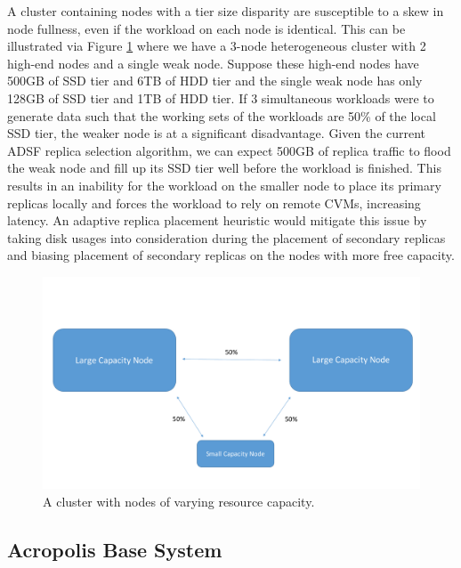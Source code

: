 \documentclass[12pt]{article}
\begin{document}
    A cluster containing nodes with a tier size disparity are susceptible to a
    skew in node fullness, even if the workload on each node is identical. This
    can be illustrated via Figure \ref{fig:tier_size_disparity} where we have a
    3-node heterogeneous cluster with 2 high-end nodes and a single weak node.
    Suppose these high-end nodes have 500GB of SSD tier and 6TB of HDD tier and
    the single weak node has only 128GB of SSD tier and 1TB of HDD tier. If 3
    simultaneous workloads were to generate data such that the working sets of
    the workloads are 50\% of the local SSD tier, the weaker node is at a
    significant disadvantage. Given the current ADSF replica selection
    algorithm, we can expect 500GB of replica traffic to flood the weak node
    and fill up its SSD tier well before the workload is finished. This results
    in an inability for the workload on the smaller node to place its primary
    replicas locally and forces the workload to rely on remote CVMs, increasing
    latency. An adaptive replica placement heuristic would mitigate this issue
    by taking disk usages into consideration during the placement of secondary
    replicas and biasing placement of secondary replicas on the nodes with more
    free capacity.

    \begin{figure}[h]
      \centering
      \includegraphics[scale=0.45]{images/homogeneous_tier_disparity.pdf} 
      \caption{A cluster with nodes of varying resource capacity.}
      \label{fig:tier_size_disparity}
    \end{figure}

  \subsection{Acropolis Base System}
\end{document}
